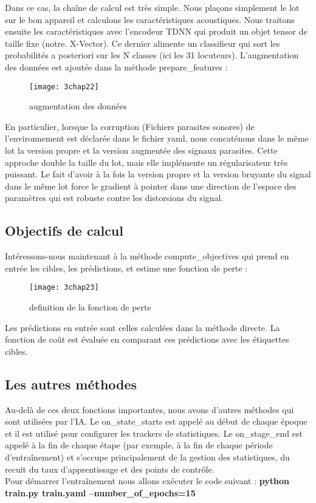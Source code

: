 Dans ce cas, la chaîne de calcul est très simple. Nous plaçons simplement le lot sur le bon appareil et calculons les caractéristiques acoustiques. Nous traitons ensuite les caractéristiques avec l'encodeur TDNN qui produit un objet tensor de taille fixe (notre. X-Vector). Ce dernier alimente un classifieur qui sort les probabilités a posteriori sur les N classes (ici les 31 locuteurs). L'augmentation des données est ajoutée dans la méthode prepare\_features :

\begin{figure}[h]
	\centering
	\texttt{[image: 3chap22]}
	\caption{augmentation des données }
	\label{fig:3chap22}
\end{figure}

En particulier, lorsque la corruption (Fichiers parasites sonores) de l'environnement est déclarée dans le fichier yaml, nous concaténons dans le même lot la version propre et la version augmentée des signaux parasites.
Cette approche double la taille du lot, mais elle implémente un régularisateur très puissant. Le fait d'avoir à la fois la version propre et la version bruyante du signal dans le même lot force le gradient à pointer dans une direction de l'espace des paramètres qui est robuste contre les distorsions du signal.

\subsection*{Objectifs de calcul}
Intéressons-nous maintenant à la méthode compute\_objectives qui prend en entrée les cibles, les prédictions, et estime une fonction de perte :

\begin{figure}[h]
	\centering
	\texttt{[image: 3chap23]}
	\caption{definition de la fonction de perte}
	\label{fig:3chap23}
\end{figure}
Les prédictions en entrée sont celles calculées dans la méthode directe. La fonction de coût est évaluée en comparant ces prédictions avec les étiquettes cibles. 

\subsection*{Les autres méthodes}
Au-delà de ces deux fonctions importantes, nous avons d'autres méthodes qui sont utilisées par l’IA. Le on\_state\_starts est appelé au début de chaque époque et il est utilisé pour configurer les trackers de statistiques. Le on\_stage\_end est appelé à la fin de chaque étape (par exemple, à la fin de chaque période d'entraînement) et s'occupe principalement de la gestion des statistiques, du recuit du taux d'apprentissage et des points de contrôle. 
\\Pour démarrer l’entraînement nous allons exécuter le code suivant :  
\textbf{python train.py train.yaml --number\_of\_epochs=15}

